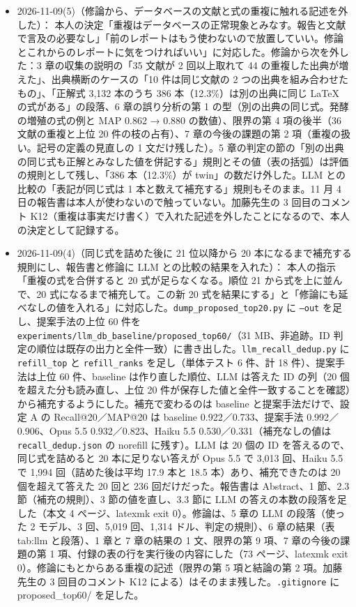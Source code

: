 \documentclass[11pt,a4paper]{jsarticle}
\begin{document}
\begin{itemize}[nosep]
  \item 2026-11-09(5)（修論から、データベースの文献と式の重複に触れる記述を外した）：
    本人の決定「重複はデータベースの正常現象とみなす。報告と文献で言及の必要なし」「前のレポートはもう使わないので放置していい。修論とこれからのレポートに気をつければいい」に対応した。修論から次を外した：3 章の収集の説明の「35 文献が 2 回以上取れて 44 の重複した出典が増えた」、出典横断のケースの「10 件は同じ文献の 2 つの出典を組み合わせたもの」、「正解式 3,132 本のうち 386 本（12.3\%）は別の出典に同じ LaTeX の式がある」の段落、6 章の誤り分析の第 1 の型（別の出典の同じ式。発酵の増殖の式の例と MAP 0.862 → 0.880 の数値）、限界の第 4 項の後半（36 文献の重複と上位 20 件の枝の占有）、7 章の今後の課題の第 2 項（重複の扱い。記号の定義の見直しの 1 文だけ残した）。5 章の判定の節の「別の出典の同じ式も正解とみなした値を併記する」規則とその値（表の括弧）は評価の規則として残し、「386 本（12.3\%）が twin」の数だけ外した。LLM との比較の「表記が同じ式は 1 本と数えて補充する」規則もそのまま。11 月 4 日の報告書は本人が使わないので触っていない。加藤先生の 3 回目のコメント K12（重複は事実だけ書く）で入れた記述を外したことになるので、本人の決定として記録する。
  \item 2026-11-09(4)（同じ式を詰めた後に 21 位以降から 20 本になるまで補充する規則にし、報告書と修論に LLM との比較の結果を入れた）：
    本人の指示「重複の式を合併すると 20 式が足らなくなる。順位 21 から式を上に並んで、20 式になるまで補充して。この新 20 式を結果にする」と「修論にも延べなしの値を入れる」に対応した。\texttt{dump\_proposed\_top20.py} に \texttt{--out} を足し、提案手法の上位 60 件を \texttt{experiments/llm\_db\_baseline/proposed\_top60/}（31 MB、非追跡。ID 判定の順位は既存の出力と全件一致）に書き出した。\texttt{llm\_recall\_dedup.py} に \texttt{refill\_top} と \texttt{refill\_ranks} を足し（単体テスト 6 件、計 18 件）、提案手法は上位 60 件、baseline は作り直した順位、LLM は答えた ID の列（20 個を超えた分も読み直し、上位 20 件が保存した値と全件一致することを確認）から補充するようにした。補充で変わるのは baseline と提案手法だけで、設定 A の Recall@20／MAP@20 は baseline 0.922／0.733、提案手法 0.992／0.906、Opus 5.5 0.932／0.823、Haiku 5.5 0.530／0.331（補充なしの値は \texttt{recall\_dedup.json} の norefill に残す）。LLM は 20 個の ID を答えるので、同じ式を詰めると 20 本に足りない答えが Opus 5.5 で 3,013 回、Haiku 5.5 で 1,994 回（詰めた後は平均 17.9 本と 18.5 本）あり、補充できたのは 20 個を超えて答えた 20 回と 236 回だけだった。報告書は Abstract、1 節、2.3 節（補充の規則）、3 節の値を直し、3.3 節に LLM の答えの本数の段落を足した（本文 4 ページ、latexmk exit 0）。修論は、5 章の LLM の段落（使った 2 モデル、3 回、5,019 回、1,314 ドル、判定の規則）、6 章の結果（表 tab:llm と段落）、1 章と 7 章の結果の 1 文、限界の第 9 項、7 章の今後の課題の第 1 項、付録の表の行を実行後の内容にした（73 ページ、latexmk exit 0）。修論にもとからある重複の記述（限界の第 5 項と結論の第 2 項。加藤先生の 3 回目のコメント K12 による）はそのまま残した。\texttt{.gitignore} に proposed\_top60/ を足した。

\end{itemize}
\end{document}
